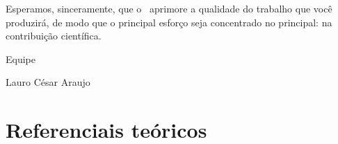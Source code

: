 \documentclass[
	12pt,				%
	openright,			%
	twoside,			%
	a4paper,			%
	english,			%
	french,				%
	spanish,			%
	brazil				%
	]{abntex2}
\begin{document}
Esperamos, sinceramente, que o \abnTeX\ aprimore a qualidade do trabalho que
você produzirá, de modo que o principal esforço seja concentrado no principal:
na contribuição científica.

Equipe \abnTeX 

Lauro César Araujo




\part{Referenciais teóricos}






\end{document}
